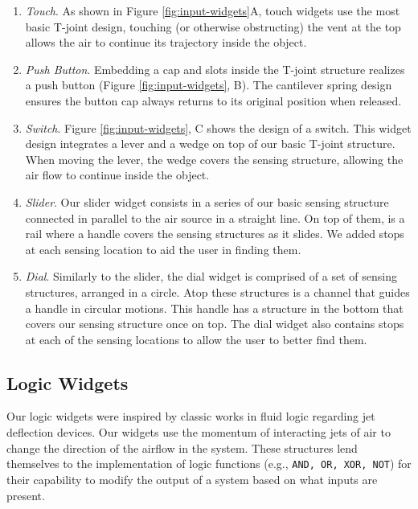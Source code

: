       \begin{enumerate}
        \item \emph{Touch}. 
          As shown in Figure \ref{fig:input-widgets}A, touch widgets use
          the most basic T-joint design, touching (or otherwise obstructing) the vent at the top
          allows the air to continue its trajectory inside the object.
        \item \emph{Push Button}. 
          Embedding a cap and slots inside the T-joint structure realizes a
          push button (Figure \ref{fig:input-widgets}, B). The cantilever spring
          design ensures the button cap always returns to its original
          position when released.
        \item \emph{Switch}. 
          Figure \ref{fig:input-widgets}, C shows the design of a switch.
          This widget design integrates a lever and a wedge on top of our
          basic T-joint structure. When moving the lever, the wedge
          covers the sensing structure, allowing the air flow to continue
          inside the object.
        \item \emph{Slider}.  
          Our slider widget consists in a series of our basic sensing
          structure connected in parallel to the air source in a straight
          line. On top of them, is a rail where a handle covers the sensing
          structures as it slides. We added stops at each sensing location
          to aid the user in finding them.
        \item \emph{Dial}.
          Similarly to the slider, the dial widget is comprised of a set of
          sensing structures, arranged in a circle. Atop these structures
          is a channel that guides a handle in circular motions. This
          handle has a structure in the bottom that covers our sensing
          structure once on top. The dial widget also contains stops at
          each of the sensing locations to allow the user to better find
          them.
      \end{enumerate}

      \subsection{Logic Widgets}
        Our logic widgets were inspired by classic works in fluid logic
        regarding jet deflection devices. Our widgets use the momentum of
        interacting jets of air to change the direction of the airflow in
        the system. These structures lend themselves to the implementation
        of logic functions (e.g., \texttt{AND, OR, XOR, NOT}) for their
        capability to modify the output of a system based on what inputs
        are present.

